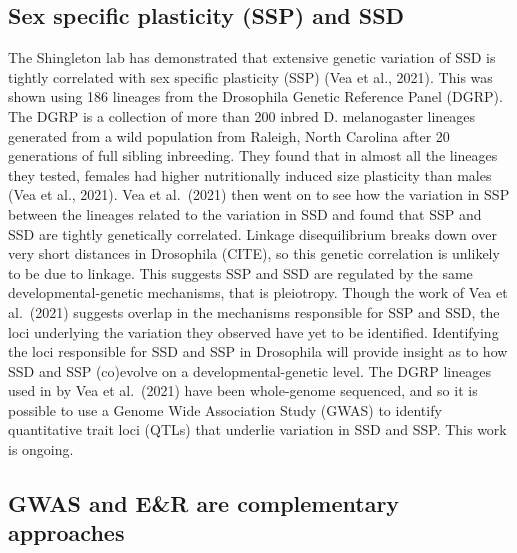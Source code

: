 \documentclass[
  11pt,
]{article}
\begin{document}
\subsection{Sex specific plasticity (SSP) and SSD}

The Shingleton lab has demonstrated that extensive genetic variation of
SSD is tightly correlated with sex specific plasticity (SSP) (Vea et
al., 2021). This was shown using 186 lineages from the Drosophila
Genetic Reference Panel (DGRP). The DGRP is a collection of more than
200 inbred D. melanogaster lineages generated from a wild population
from Raleigh, North Carolina after 20 generations of full sibling
inbreeding. They found that in almost all the lineages they tested,
females had higher nutritionally induced size plasticity than males (Vea
et al., 2021). Vea et al.~(2021) then went on to see how the variation
in SSP between the lineages related to the variation in SSD and found
that SSP and SSD are tightly genetically correlated. Linkage
disequilibrium breaks down over very short distances in Drosophila
(CITE), so this genetic correlation is unlikely to be due to linkage.
This suggests SSP and SSD are regulated by the same
developmental-genetic mechanisms, that is pleiotropy. Though the work of
Vea et al.~(2021) suggests overlap in the mechanisms responsible for SSP
and SSD, the loci underlying the variation they observed have yet to be
identified. Identifying the loci responsible for SSD and SSP in
Drosophila will provide insight as to how SSD and SSP (co)evolve on a
developmental-genetic level. The DGRP lineages used in by Vea et
al.~(2021) have been whole-genome sequenced, and so it is possible to
use a Genome Wide Association Study (GWAS) to identify quantitative
trait loci (QTLs) that underlie variation in SSD and SSP. This work is
ongoing.

\subsection{GWAS and E\&R are complementary approaches}
\end{document}
